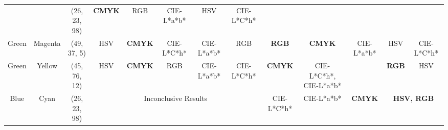 \begin{table}[htbp]
{\begin{tabular}{@{}ccclcccccccccc@{}}
                            & \multicolumn{1}{c|}{}                          & \multicolumn{2}{c|}{\cellcolor[HTML]{0080FF}(26, 23, 98)}  & \multicolumn{1}{c|}{\cellcolor[HTML]{FFFFFF}\textbf{CMYK}} & \multicolumn{1}{c|}{RGB}           & \multicolumn{1}{c|}{CIE-L*a*b*} & \multicolumn{1}{c|}{HSV}        & \multicolumn{1}{c|}{CIE-L*C*h*} & \multicolumn{1}{c|}{}                                & \multicolumn{1}{c|}{}                                & \multicolumn{1}{c|}{}                             & \multicolumn{1}{c|}{}                             & \multicolumn{1}{c|}{}                             \\ \cmidrule(lr){3-9}
    \multirow{-2}{*}{Green} & \multicolumn{1}{c|}{\multirow{-2}{*}{Magenta}} & \multicolumn{2}{c}{\cellcolor[HTML]{FF8000}(49, 37, 5)}    & \multicolumn{1}{c|}{HSV}                                   & \multicolumn{1}{c|}{\textbf{CMYK}} & \multicolumn{1}{c|}{CIE-L*C*h*} & \multicolumn{1}{c|}{CIE-L*a*b*} & \multicolumn{1}{c|}{RGB}        & \multicolumn{1}{c|}{\multirow{-2}{*}{\textbf{RGB}}}  & \multicolumn{1}{c|}{\multirow{-2}{*}{\textbf{CMYK}}} & \multicolumn{1}{c|}{\multirow{-2}{*}{CIE-L*a*b*}} & \multicolumn{1}{c|}{\multirow{-2}{*}{HSV}}        & \multicolumn{1}{c|}{\multirow{-2}{*}{CIE-L*C*h*}} \\ \midrule
    Green                   & \multicolumn{1}{c|}{Yellow}                    & \multicolumn{2}{c|}{\cellcolor[HTML]{80FF00}(45, 76, 12)}  & \multicolumn{1}{c|}{HSV}                                   & \multicolumn{1}{c|}{\textbf{CMYK}} & \multicolumn{1}{c|}{RGB}        & \multicolumn{1}{c|}{CIE-L*a*b*} & \multicolumn{1}{c|}{CIE-L*C*h*} & \multicolumn{1}{c|}{\textbf{CMYK}}                   & \multicolumn{1}{c|}{CIE-L*C*h*, CIE-L*a*b*}          & \multicolumn{1}{c|}{}                             & \multicolumn{1}{c|}{\textbf{RGB}}                 & \multicolumn{1}{c|}{HSV}                          \\ \midrule
    Blue                    & \multicolumn{1}{c|}{Cyan}                      & \multicolumn{2}{c|}{\cellcolor[HTML]{0080FF}(26, 23, 98)}  & \multicolumn{5}{c|}{Inconclusive Results}                                                                                                                                                             & \multicolumn{1}{c|}{CIE-L*C*h*}                      & \multicolumn{1}{c|}{CIE-L*a*b*}                      & \multicolumn{1}{c|}{\textbf{CMYK}}                & \multicolumn{2}{c|}{\textbf{HSV, RGB}}                                                                \\ \midrule

\end{tabular}}
\end{table}
